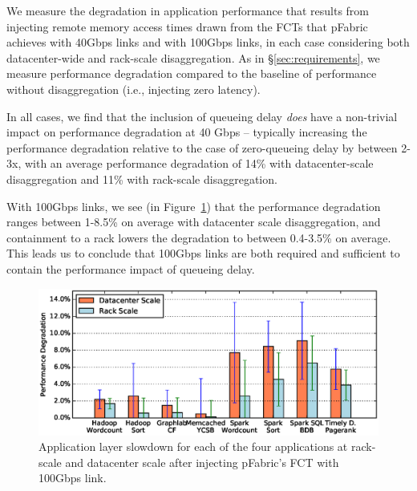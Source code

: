 We measure the degradation in application performance that results from injecting remote memory access times drawn from the FCTs that pFabric achieves with 40Gbps links and with 100Gbps links, in each case considering both datacenter-wide and rack-scale disaggregation. As in \S\ref{sec:requirements}, we measure performance degradation compared to the baseline of performance without disaggregation (i.e., injecting zero latency). 

In all cases, we find that the inclusion of queueing delay \emph{does} have a non-trivial impact on performance degradation at 40 Gbps -- typically increasing the performance degradation relative to the case of zero-queueing delay by between 2-3x, with an average performance degradation of 14\% with datacenter-scale disaggregation and 11\% with rack-scale disaggregation. 

With 100Gbps links, we see (in Figure~\ref{fig:appfabric100}) that the performance degradation ranges between 1-8.5\% on average with datacenter scale disaggregation, and containment to a rack lowers the degradation to between 0.4-3.5\% on average.
This leads us to conclude that 100Gbps links are both required and sufficient to contain the performance impact of queueing delay.
%
%
\begin{figure}
  \centering
    \includegraphics[width = \columnwidth]{img/slowdown.eps} 
  \caption{\small{Application layer slowdown for each of the four applications at rack-scale and datacenter scale after injecting pFabric's FCT with 100Gbps link. }}
  \label{fig:appfabric100}
\end{figure}
%

